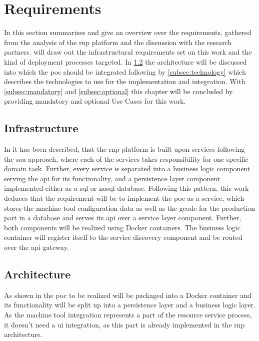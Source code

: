 \documentclass[
a4paper,
twoside,
headsepline,
cleardoublepage=empty,
parskip=half,
draft=false
]{scrbook}
\begin{document}
		\section{Requirements} \label{sec:requirements}

			In this section summarizes and give an overview over the requirements, gathered from the analysis of the \gls{rnp} platform and the discussion with the research partners.
			 will draw out the infrastructural requirements set on this work and the kind of deployment processes targeted.
			In \cref{subsec:architecture} the architecture will be discussed into which the \gls{poc} should be integrated following by \cref{subsec:technology} which describes the technologies to use for the implementation and integration.
			With \cref{subsec:mandatory} and \cref{subsec:optional} this chapter will be concluded by providing mandatory and optional Use Cases for this work.

			\subsection{Infrastructure} \label{subsec:infrastructure}

				In  it has been described, that the \gls{rnp} platform is built upon services following the \gls{soa} approach, where each of the services takes responsibility for one specific domain task.
				Further, every service is separated into a business logic component serving the \gls{api} for its functionality, and a persistence layer component implemented either as a \gls{sql} or \gls{nosql} database.
				Following this pattern, this work deduces that the requirement will be to implement the \gls{poc} as a service, which stores the machine tool configuration data as well as the \gls{gcode} for the production part in a database and serves its \gls{api} over a service layer component.
				Further, both components will be realized using Docker containers.
				The business logic container will register itself to the service discovery component and be routed over the \gls{api} gateway.

			\subsection{Architecture} \label{subsec:architecture}

				As shown in  the \gls{poc} to be realized will be packaged into a Docker container and its functionality will be split up into a persistence layer and a business logic layer.
				As the machine tool integration represents a part of the resource service process, it doesn't need a \gls{ui} integration, as this part is already implemented in the \gls{rnp} architecture.
\end{document}
